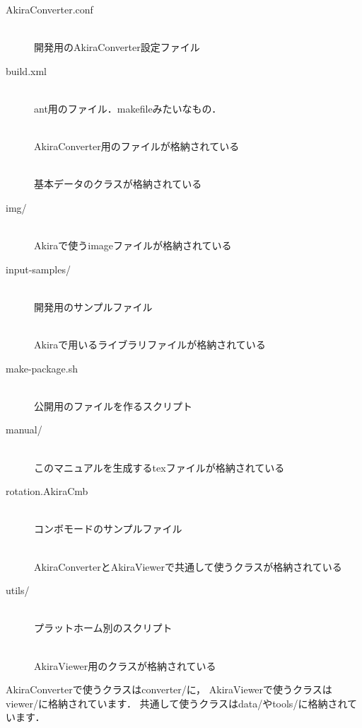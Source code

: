 \documentclass[a4j,openany]{jbook}
\begin{document}
  \begin{description}
   \item[AkiraConverter.conf ] \mbox{} \\
              開発用のAkiraConverter設定ファイル
   \item[build.xml] \mbox{} \\
              ant用のファイル．makefileみたいなもの．
   \item[] \mbox{} \\
              AkiraConverter用のファイルが格納されている
   \item[] \mbox{} \\
              基本データのクラスが格納されている
   \item[img/] \mbox{} \\
              Akiraで使うimageファイルが格納されている
   \item[input-samples/] \mbox{} \\
              開発用のサンプルファイル
   \item[] \mbox{} \\
              Akiraで用いるライブラリファイルが格納されている
   \item[make-package.sh] \mbox{} \\
              公開用のファイルを作るスクリプト
   \item[manual/] \mbox{} \\
              このマニュアルを生成するtexファイルが格納されている
   \item[rotation.AkiraCmb] \mbox{} \\
              コンボモードのサンプルファイル
   \item[] \mbox{} \\
              AkiraConverterとAkiraViewerで共通して使うクラスが格納されている
   \item[utils/] \mbox{} \\
              プラットホーム別のスクリプト
   \item[] \mbox{} \\
              AkiraViewer用のクラスが格納されている
  \end{description}
  AkiraConverterで使うクラスはconverter/に，
  AkiraViewerで使うクラスはviewer/に格納されています．
  共通して使うクラスはdata/やtools/に格納されています．
\end{document}
